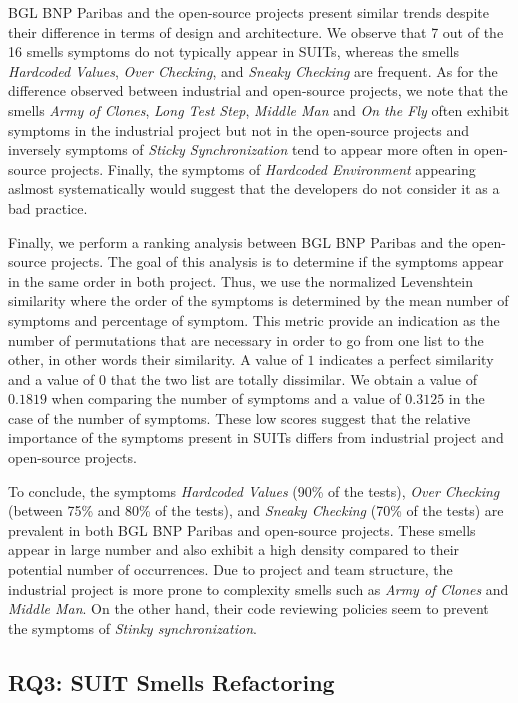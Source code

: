 BGL BNP Paribas and the open-source projects present similar trends despite their difference in terms of design and architecture. We observe that 7 out of the 16 smells symptoms do not typically appear in SUITs, whereas the smells \emph{Hardcoded Values}, \emph{Over Checking}, and \emph{Sneaky Checking} are frequent. As for the difference observed between industrial and open-source projects, we note that the smells \emph{Army of Clones}, \emph{Long Test Step}, \emph{Middle Man} and \emph{On the Fly} often exhibit symptoms in the industrial project but not in the open-source projects and inversely symptoms of \emph{Sticky Synchronization} tend to appear more often in open-source projects. Finally, the symptoms of \emph{Hardcoded Environment} appearing aslmost systematically would suggest that the developers do not consider it as a bad practice.

Finally, we perform a ranking analysis between BGL BNP Paribas and the open-source projects. The goal of this analysis is to determine if the symptoms appear in the same order in both project. Thus, we use the normalized Levenshtein similarity where the order of the symptoms is determined by the mean number of symptoms and percentage of symptom. This metric provide an indication as the number of permutations that are necessary in order to go from one list to the other, in other words their similarity. A value of $1$ indicates a perfect similarity and a value of $0$ that the two list are totally dissimilar. We obtain a value of $0.1819$ when comparing the number of symptoms and a value of $0.3125$ in the case of the number of symptoms. These low scores suggest that the relative importance of the symptoms present in SUITs differs from industrial project and open-source projects.


To conclude, the symptoms \emph{Hardcoded Values} (90\% of the tests), \emph{Over Checking} (between 75\% and 80\% of the tests), and \emph{Sneaky Checking} (70\% of the tests) are prevalent in both BGL BNP Paribas and open-source projects. These smells appear in large number and also exhibit a high density compared to their potential number of occurrences. Due to project and team structure, the industrial project is more prone to complexity smells such as \emph{Army of Clones} and \emph{Middle Man}. On the other hand, their code reviewing policies seem to prevent the symptoms of \emph{Stinky synchronization}.

\subsection{RQ3: SUIT Smells Refactoring}
\label{sec:results-smell-refactoring}


